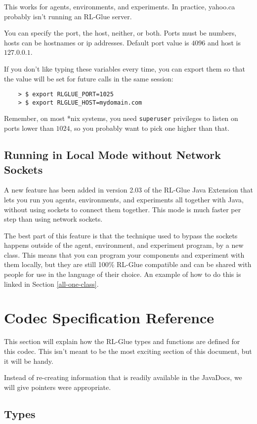 \documentclass[11pt]{article}
\begin{document}
This works for agents, environments, and experiments.  In practice, yahoo.ca probably isn't running an RL-Glue server.

You can specify the port, the host, neither, or both.  Ports must be numbers, hosts can be hostnames or ip addresses. Default port value is $4096$ and host is $127.0.0.1$.

If you don't like typing these variables every time, you can export them so that the value will be set for future
calls  in the same session:
\begin{verbatim}
	> $ export RLGLUE_PORT=1025
	> $ export RLGLUE_HOST=mydomain.com
\end{verbatim}

Remember, on most *nix systems, you need \texttt{superuser} privileges to listen on ports lower than $1024$, so you probably want to pick one higher than that.

\subsection{Running in Local Mode without Network Sockets}
\label{no-sockets}
A new feature has been added in version 2.03 of the RL-Glue Java Extension that lets you run you agents, environments, and experiments all together with Java, without using sockets to connect them together.  This mode is much faster per step than using network sockets.  

The best part of this feature is that the technique used to bypass the sockets happens outside of the agent, environment, and experiment program, by a new class.  This means that you can program your components and experiment with them locally, but they are still 100\% RL-Glue compatible and can be shared with people for use in the language of their choice.  An example of how to do this is linked in Section \ref{all-one-class}.

\section{Codec Specification Reference}
This section will explain how the RL-Glue types and functions are defined for this codec.  This isn't meant to be the most exciting section of this document, but it will
be handy.

Instead of re-creating information that is readily available in the JavaDocs, we will give pointers were appropriate.

\subsection{Types}
\end{document}
